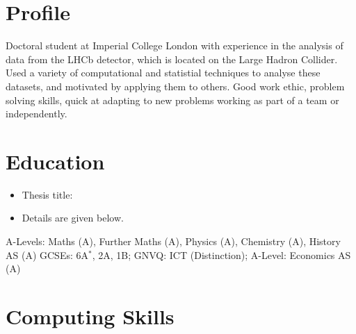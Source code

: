 \makecvtitle


\section{Profile}
\cvline{}{}
{
  Doctoral student at Imperial College London with experience in the analysis of data
  from the LHCb detector, which is located on the Large Hadron Collider.
  Used a variety of computational and statistial techniques to analyse these datasets, and
  motivated by applying them to others.
  Good work ethic, problem solving skills, quick at adapting to new problems working as part of a
  team or independently.
}


\section{Education}
{
  \begin{itemize}
    \item Thesis title:
    \item Details are given below.
  \end{itemize}
}
{A-Levels: Maths (A), Further Maths (A), Physics (A), Chemistry (A), History AS (A)}
{GCSEs: 6A$^*$, 2A, 1B; GNVQ: ICT (Distinction); A-Level: Economics AS (A)}


\section{Computing Skills}


